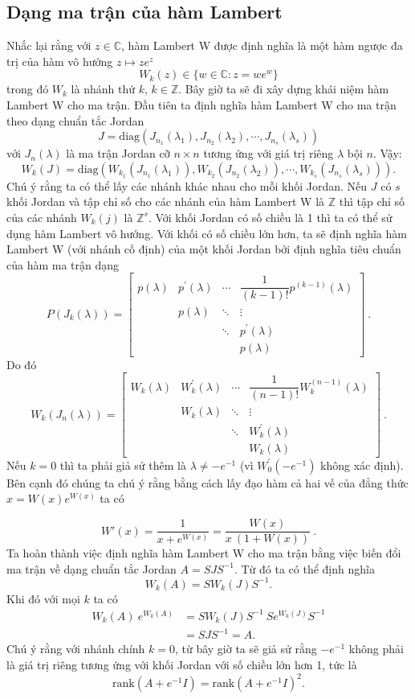 \subsection{Dạng ma trận  của hàm Lambert}\label{sec1.1.2}
Nhắc lại rằng với $z\in \mathbb{C}$, hàm Lambert W được định nghĩa là một hàm ngược đa trị của hàm vô hướng $z\mapsto ze^z$
$$W_k(z)\in\{w\in\mathbb{C}:z=we^w\}$$
trong đó $W_k$ là nhánh thứ $k$, $k\in\mathbb{Z}$.  Bây giờ ta sẽ đi xây dựng khái niệm hàm Lambert W cho ma trận. Đầu tiên ta định nghĩa hàm Lambert W cho ma trận theo dạng chuẩn tắc Jordan
$$ J=\text{diag}(J_{n_1}(\lambda_1),J_{n_2}(\lambda_2),\cdots,J_{n_s}(\lambda_s))$$
với $J_n(\lambda)$ là ma trận Jordan cỡ $n\times n$ tương ứng với giá trị riêng $\lambda$ bội $n$. Vậy:
$$W_k(J)=\text{diag}(W_{k_1}(J_{n_1}(\lambda_1)),W_{k_2}(J_{n_2}(\lambda_2)),\cdots,W_{k_s}(J_{n_s}(\lambda_s))).$$
Chú ý rằng ta có thể lấy các nhánh khác nhau cho mỗi khối Jordan. Nếu $J$ có $s$ khối Jordan và tập chỉ số cho các nhánh của hàm Lambert W là $\mathbb{Z}$ thì tập chỉ số của các nhánh $W_k(j)$ là $\mathbb{Z}^s$. 
Với khối Jordan có số chiều là 1 thì ta có thể sử dụng hàm Lambert vô hướng. Với khối có số chiều lớn hơn, ta sẽ định nghĩa hàm Lambert W (với nhánh cố định) của một khối Jordan bởi định nghĩa tiêu chuẩn của hàm ma trận dạng
$$P(J_k(\lambda))=\begin{bmatrix}
p(\lambda)&p^\prime(\lambda)&\cdots & \dfrac{1}{(k-1)!}p^{(k-1)}(\lambda)\\
& p(\lambda) & \ddots & \vdots\\
 & & \ddots & p^\prime(\lambda)\\
& &  & p(\lambda)
\end{bmatrix}
\ . 
$$
Do đó 
$$ W_k(J_n(\lambda))=\begin{bmatrix}
W_k(\lambda)&W_k^\prime(\lambda)&\cdots & \dfrac{1}{(n-1)!}W_k^{(n-1)}(\lambda)\\
& W_k(\lambda) & \ddots & \vdots\\
 & & \ddots & W_k^\prime(\lambda)\\
& &  & W_k(\lambda)
\end{bmatrix}
\ .
$$
Nếu $k=0$ thì ta phải giả sử thêm là $\lambda\neq -e^{-1}$ (vì $W_0^\prime(-e^{-1})$ không xác định).\\
Bên cạnh đó chúng ta chú ý rằng bằng cách lấy đạo hàm cả hai vế của đẳng thức $x = W(x) e^{W(x)}$ ta có
%

\begin{equation}\label{der-w}
W'(x) = \dfrac{1}{x+e^{W(x)}} = \dfrac{W(x)}{x \ (1+W(x))} \ .
\end{equation}
%
Ta hoàn thành việc định nghĩa hàm Lambert W cho ma trận bằng việc biến đổi ma trận về dạng chuẩn tắc Jordan $A=SJS^{-1}$. Từ đó ta có thể định nghĩa 
$$W_k(A)=SW_k(J)S^{-1}.$$
Khi đó với mọi $k$ ta có
%
\begin{align*}
W_k(A) \ e^{W_k(A)} &= S W_k (J) S^{-1} \ S e^{W_k (J)} S^{-1} \\
&= S J S^{-1} = A.
\end{align*}
%
Chú ý rằng với nhánh chính $k=0$, từ bây giờ ta sẽ giả sử rằng $-e^{-1}$ không phải là giá trị riêng tương ứng với khối Jordan với số chiều lớn hơn 1, tức là
$$\text{rank}(A+e^{-1}I)=\text{rank}(A+e^{-1}I)^2.$$

